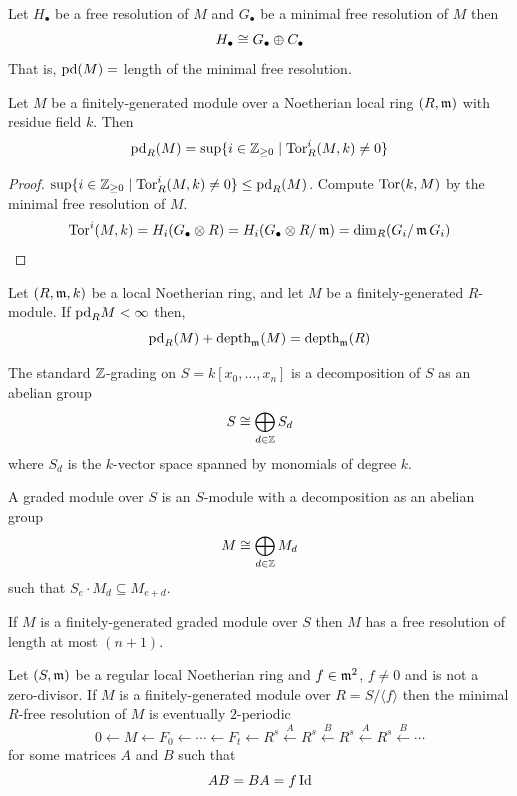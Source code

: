 \documentclass[12pt]{amsart}
\begin{document}
\begin{lemma}
    Let $H_\bullet$ be a free resolution of $M$ and $G_\bullet$ be a minimal free resolution of $M$ then 
    \[H_\bullet \cong G_\bullet \oplus C_\bullet\]
    That is, $\text{pd}(M) = $ length of the minimal free resolution. 
\end{lemma}

\begin{lemma}
    Let $M$ be a finitely-generated module over a Noetherian local ring $(R, \operatorname{\mathfrak{m}})$ with residue field $k$. Then 
    \[\text{pd}_R(M) = \sup \{i \in \mathbb Z_{\geq 0} \mid \text{Tor}_R^i (M, k) \neq 0\}\]
\end{lemma} 

\begin{proof}
    $\sup \{i \in \mathbb Z_{\geq 0} \mid \text{Tor}_R^i (M, k) \neq 0\} \leq \text{pd}_R(M)$. Compute $\text{Tor}(k, M)$ by the minimal free resolution of $M$. 
    \[\text{Tor}^i(M, k) = H_i(G_\bullet \otimes R) = H_i(G_\bullet \otimes R/\operatorname{\mathfrak{m}}) = \dim_R(G_i/\operatorname{\mathfrak{m}} G_i)\]
    \todo{}
\end{proof}

\begin{theorem}
    Let $(R, \operatorname{\mathfrak{m}}, k)$ be a local Noetherian ring, and let $M$ be a finitely-generated $R$-module. If $\text{pd}_R M < \infty$ then, 
    \[\text{pd}_R (M) + \operatorname{\text{depth}}_{\operatorname{\mathfrak{m}}}(M) = \operatorname{\text{depth}}_{\operatorname{\mathfrak{m}}}(R)\]
\end{theorem}

\begin{definition}
    The standard $\mathbb Z$-grading on $S = k[x_0, \ldots, x_n]$ is a decomposition of $S$ as an abelian group 
    \[S \cong \bigoplus_{d \in \mathbb Z} S_d\]
    where $S_d$ is the $k$-vector space spanned by monomials of degree $k$. 

    A graded module over $S$ is an $S$-module with a decomposition as an abelian group
    \[M \cong \bigoplus_{d \in \mathbb Z} M_d\]
    such that $S_e \cdot M_d \subseteq M_{e+d}$. 
\end{definition}

\begin{theorem}
    If $M$ is a finitely-generated graded module over $S$ then $M$ has a free resolution of length at most $(n+1)$. 
\end{theorem}

\begin{theorem}[Eisenbud]
    Let $(S, \operatorname{\mathfrak{m}})$ be a regular local Noetherian ring and $f \in \operatorname{\mathfrak{m}}^2$, $f \neq 0$ and is not a zero-divisor. If $M$ is a finitely-generated module over $R = S /\langle f \rangle$ then the minimal $R$-free resolution of $M$ is eventually $2$-periodic 
    \[0 \leftarrow M \leftarrow F_0 \leftarrow \cdots \leftarrow F_t \leftarrow R^s \xleftarrow{A} R^s \xleftarrow{B} R^s \xleftarrow{A} R^s \xleftarrow{B} \cdots\]
    for some matrices $A$ and $B$ such that 
    \[AB = BA = f \operatorname{Id}\]
\end{theorem}
\end{document}
